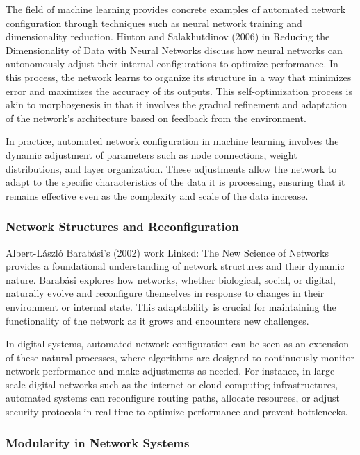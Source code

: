 \documentclass[12pt,twoside]{article}
\begin{document}
The field of machine learning provides concrete examples of automated network configuration through techniques such as neural network training and dimensionality reduction. Hinton and Salakhutdinov (2006) in Reducing the Dimensionality of Data with Neural Networks discuss how neural networks can autonomously adjust their internal configurations to optimize performance. In this process, the network learns to organize its structure in a way that minimizes error and maximizes the accuracy of its outputs. This self-optimization process is akin to morphogenesis in that it involves the gradual refinement and adaptation of the network’s architecture based on feedback from the environment.

In practice, automated network configuration in machine learning involves the dynamic adjustment of parameters such as node connections, weight distributions, and layer organization. These adjustments allow the network to adapt to the specific characteristics of the data it is processing, ensuring that it remains effective even as the complexity and scale of the data increase.

\subsubsection{Network Structures and Reconfiguration}

Albert-László Barabási’s (2002) work Linked: The New Science of Networks provides a foundational understanding of network structures and their dynamic nature. Barabási explores how networks, whether biological, social, or digital, naturally evolve and reconfigure themselves in response to changes in their environment or internal state. This adaptability is crucial for maintaining the functionality of the network as it grows and encounters new challenges.

In digital systems, automated network configuration can be seen as an extension of these natural processes, where algorithms are designed to continuously monitor network performance and make adjustments as needed. For instance, in large-scale digital networks such as the internet or cloud computing infrastructures, automated systems can reconfigure routing paths, allocate resources, or adjust security protocols in real-time to optimize performance and prevent bottlenecks.

\subsubsection{Modularity in Network Systems}
\end{document}
